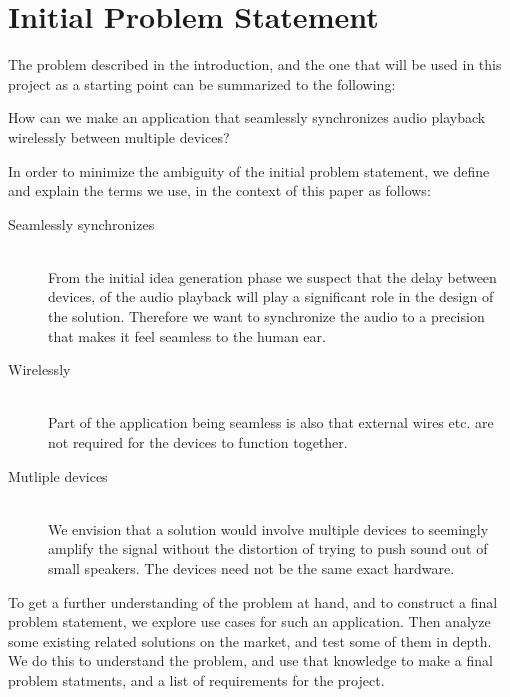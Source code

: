 \section{Initial Problem Statement}\label{sec:initial_problem}

The problem described in the introduction, and the one that will be used
in this project as a starting point can be summarized to the following:

\begin{problemstatement}
    How can we make an application that seamlessly synchronizes audio
    playback wirelessly between multiple devices?
\end{problemstatement}

\noindent
In order to minimize the ambiguity of the initial problem statement,
we define and explain the terms we use, in the context of this paper as follows:

\begin{description}
    \item[Seamlessly synchronizes]  \hfill \\
        From the initial idea generation phase we suspect
        that the delay between devices, of the audio playback will
        play a significant role in the design of the solution. Therefore we
        want to synchronize the audio to a precision that makes it feel
        seamless to the human ear.
    \item[Wirelessly]  \hfill \\
        Part of the application being seamless is also that external wires etc. are
        not required for the devices to function together.
    \item[Mutliple devices]  \hfill \\
        We envision that a solution would involve multiple devices to seemingly
        amplify the signal without the distortion of trying to push sound out of
        small speakers. The devices need not be the same exact hardware.
\end{description}

To get a further understanding of the problem at hand, and to
construct a final problem statement, we explore use
cases for such an application.
Then analyze some existing related solutions on the market,
and test some of them in depth.
We do this to understand the problem, and use that knowledge
to make a final problem statments, and a list of requirements for the project.
